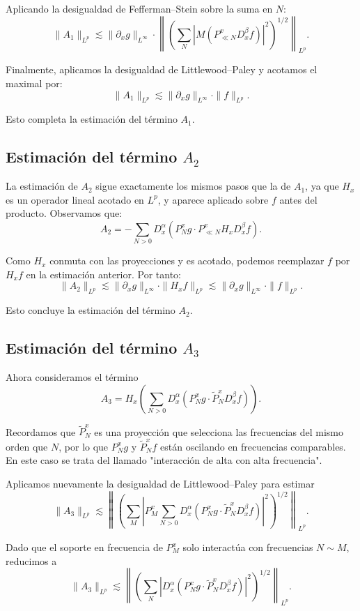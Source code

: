 \documentclass{aleph-revista}
\begin{document}
Aplicando la desigualdad de Fefferman--Stein sobre la suma en \( N \):
\[
\|A_1\|_{L^p} \lesssim \| \partial_x g \|_{L^\infty} \cdot \left\| \left( \sum_{N} |M(P_{\ll N}^x D_x^\beta f)|^2 \right)^{1/2} \right\|_{L^p}.
\]

Finalmente, aplicamos la desigualdad de Littlewood--Paley y acotamos el maximal por:
\[
\|A_1\|_{L^p} \lesssim \| \partial_x g \|_{L^\infty} \cdot \|f\|_{L^p}.
\]

Esto completa la estimaci\'on del t\'ermino $A_1$.
\subsection*{Estimaci\'on del t\'ermino $A_2$}

La estimaci\'on de $A_2$ sigue exactamente los mismos pasos que la de $A_1$, ya que $H_x$ es un operador lineal acotado en $L^p$, y aparece aplicado sobre $f$ antes del producto. Observamos que:
\[
A_2 = - \sum_{N > 0} D_x^\alpha (P_N^x g \cdot P_{\ll N}^x H_x D_x^\beta f).
\]

Como $H_x$ conmuta con las proyecciones y es acotado, podemos reemplazar $f$ por $H_x f$ en la estimaci\'on anterior. Por tanto:
\[
\|A_2\|_{L^p} \lesssim \| \partial_x g \|_{L^\infty} \cdot \| H_x f \|_{L^p} \lesssim \| \partial_x g \|_{L^\infty} \cdot \|f\|_{L^p}.
\]

Esto concluye la estimaci\'on del t\'ermino $A_2$.
\subsection*{Estimaci\'on del t\'ermino $A_3$}

Ahora consideramos el t\'ermino
\[
A_3 = H_x \left( \sum_{N>0} D_x^\alpha (P_N^x g \cdot \widetilde{P}_N^x D_x^\beta f) \right).
\]

Recordamos que \( \widetilde{P}_N^x \) es una proyecci\'on que selecciona las frecuencias del mismo orden que $N$, por lo que $P_N^x g$ y $\widetilde{P}_N^x f$ est\'an oscilando en frecuencias comparables. En este caso se trata del llamado "interacci\'on de alta con alta frecuencia".

Aplicamos nuevamente la desigualdad de Littlewood--Paley para estimar
\[
\|A_3\|_{L^p} \lesssim \left\| \left( \sum_{M} |P_M^x \sum_{N > 0} D_x^\alpha (P_N^x g \cdot \widetilde{P}_N^x D_x^\beta f)|^2 \right)^{1/2} \right\|_{L^p}.
\]

Dado que el soporte en frecuencia de $P_M^x$ solo interact\'ua con frecuencias $N \sim M$, reducimos a
\[
\|A_3\|_{L^p} \lesssim \left\| \left( \sum_{N} |D_x^\alpha (P_N^x g \cdot \widetilde{P}_N^x D_x^\beta f)|^2 \right)^{1/2} \right\|_{L^p}.
\]
\end{document}
